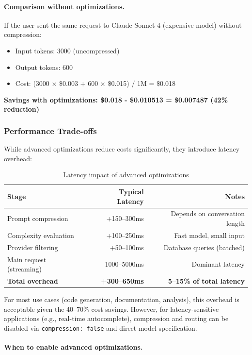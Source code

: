 \documentclass[english]{article}
\begin{document}
\paragraph{Comparison without optimizations.}

If the user sent the same request to Claude Sonnet 4 (expensive model) without compression:
\begin{itemize}
    \item Input tokens: 3000 (uncompressed)
    \item Output tokens: 600
    \item Cost: (3000 × \$0.003 + 600 × \$0.015) / 1M = \$0.018
\end{itemize}

\textbf{Savings with optimizations: \$0.018 - \$0.010513 = \$0.007487 (42\% reduction)}

\subsubsection{Performance Trade-offs}

While advanced optimizations reduce costs significantly, they introduce latency overhead:

\begin{table}[H]
\centering
\caption{Latency impact of advanced optimizations}
\begin{tabular}{|l|r|r|}
\hline
\textbf{Stage} & \textbf{Typical Latency} & \textbf{Notes} \\
\hline
Prompt compression & +150--300ms & Depends on conversation length \\
Complexity evaluation & +100--250ms & Fast model, small input \\
Provider filtering & +50--100ms & Database queries (batched) \\
Main request (streaming) & 1000--5000ms & Dominant latency \\
\hline
\textbf{Total overhead} & \textbf{+300--650ms} & \textbf{5--15\% of total latency} \\
\hline
\end{tabular}
\end{table}

For most use cases (code generation, documentation, analysis), this overhead is acceptable given the 40--70\% cost savings. However, for latency-sensitive applications (e.g., real-time autocomplete), compression and routing can be disabled via \texttt{compression: false} and direct model specification.

\paragraph{When to enable advanced optimizations.}
\end{document}

